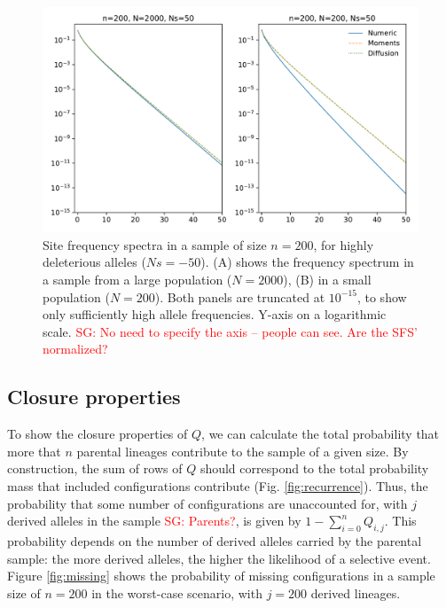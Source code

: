 \documentclass[review]{elsarticle}
\newcommand{\sgcomment}[1]{\textcolor{red}{SG: #1}}
\begin{document}
\begin{figure}
  \centering
  \includegraphics[width=0.7\textheight]{fig/strong_selection.pdf}
  \caption{Site frequency spectra in a sample of size $n=200$, for highly deleterious alleles
    ($Ns=-50$). (A) shows the frequency spectrum in a sample from a large population ($N=2000$), (B)
  in a small population ($N=200$). Both panels are truncated at $10^{-15}$, to show only
  sufficiently high allele frequencies. Y-axis on a logarithmic scale. \sgcomment{No need to specify the axis -- people can see. Are the SFS' normalized?}}
  \label{fig:strong-selection}
\end{figure}

\subsection{Closure properties}
\label{subsec:closure}

To show the closure properties of $Q$, we can calculate the total probability that more that $n$
parental lineages contribute to the sample of a given size. By construction, the sum of rows of $Q$
should correspond to the total probability mass that included configurations contribute
(Fig. \ref{fig:recurrence}). Thus, the probability that some number of configurations are
unaccounted for, with $j$ derived alleles in the sample \sgcomment{Parents?}, is given by
$1-\sum_{i=0}^{n}Q_{i,j}$. This probability depends on the number of derived alleles carried by the parental sample: the more derived alleles, the higher the likelihood of a selective event. Figure \ref{fig:missing} shows the probability of missing configurations in a sample size of $n=200$ in the worst-case scenario, with $j=200$ derived lineages.
\end{document}
